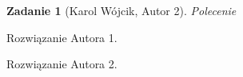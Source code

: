 \documentclass{mwart}
\newtheorem{zad}{Zadanie}[section]
\begin{document}
\begin{zad}[Karol Wójcik, Autor 2]
    Polecenie
\end{zad}
\begin{mdframed}
    Rozwiązanie Autora 1.
\end{mdframed}
\begin{mdframed}
    Rozwiązanie Autora 2.
\end{mdframed}

%
\end{document}
